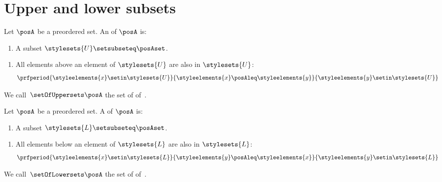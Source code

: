 
\section{Upper and lower subsets}
\label{sec:UpperLowerSets}

\begin{definition}
    \label{def:upperset}
    Let $\posA$ be a preordered set. An  of $\posA$ is:

    \constit
    \begin{enumerate}
        \item A subset $\stylesets{U} \setsubseteq \posAset$.
    \end{enumerate}

    \condit
    \begin{enumerate}
        \item All elements above an element of $\stylesets{U}$ are also in $\stylesets{U}$:
              \begin{equation}
                  \prfperiod{\styleelements{x}\setin \stylesets{U}}{\styleelements{x}\posAleq \styleelements{y}}{\styleelements{y}\setin \stylesets{U}}
              \end{equation}
    \end{enumerate}
\end{definition}
We call~$\setOfUppersets \posA$ the set of  of~\posA.

\begin{definition}
    \label{def:lowerset}
    Let $\posA$ be a preordered set. A  of $\posA$ is:

    \constit
    \begin{enumerate}
        \item A subset $\stylesets{L} \setsubseteq \posAset$.
    \end{enumerate}

    \condit
    \begin{enumerate}
        \item All elements below an element of $\stylesets{L}$ are also in $\stylesets{L}$:
              \begin{equation}
                  \prfperiod{\styleelements{x}\setin \stylesets{L}}{\styleelements{y}\posAleq \styleelements{x}}{\styleelements{y}\setin \stylesets{L}}
              \end{equation}
    \end{enumerate}
\end{definition}
We call~$\setOfLowersets\posA$ the set of  of~\posA.
%

